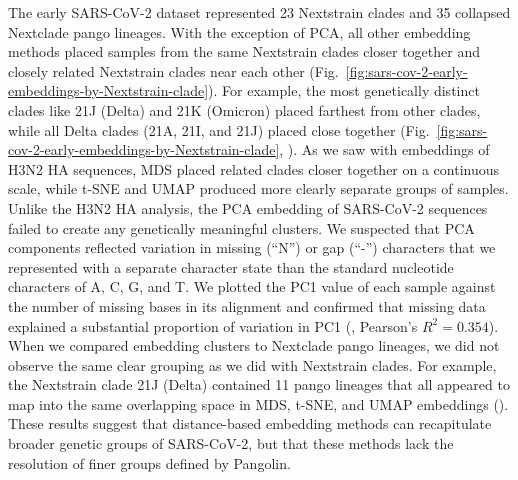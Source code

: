 \documentclass[10pt,letterpaper]{article}
\begin{document}
The early SARS-CoV-2 dataset represented 23 Nextstrain clades and 35 collapsed Nextclade pango lineages.
With the exception of PCA, all other embedding methods placed samples from the same Nextstrain clades closer together and closely related Nextstrain clades near each other (Fig.~\ref{fig:sars-cov-2-early-embeddings-by-Nextstrain-clade}).
For example, the most genetically distinct clades like 21J (Delta) and 21K (Omicron) placed farthest from other clades, while all Delta clades (21A, 21I, and 21J) placed close together (Fig.~\ref{fig:sars-cov-2-early-embeddings-by-Nextstrain-clade}, ).
As we saw with embeddings of H3N2 HA sequences, MDS placed related clades closer together on a continuous scale, while t-SNE and UMAP produced more clearly separate groups of samples.
Unlike the H3N2 HA analysis, the PCA embedding of SARS-CoV-2 sequences failed to create any genetically meaningful clusters.
We suspected that PCA components reflected variation in missing (``N'') or gap (``-'') characters that we represented with a separate character state than the standard nucleotide characters of A, C, G, and T.
We plotted the PC1 value of each sample against the number of missing bases in its alignment and confirmed that missing data explained a substantial proportion of variation in PC1 (, Pearson's $R^{2}=0.354$).
When we compared embedding clusters to Nextclade pango lineages, we did not observe the same clear grouping as we did with Nextstrain clades.
For example, the Nextstrain clade 21J (Delta) contained 11 pango lineages that all appeared to map into the same overlapping space in MDS, t-SNE, and UMAP embeddings ().
These results suggest that distance-based embedding methods can recapitulate broader genetic groups of SARS-CoV-2, but that these methods lack the resolution of finer groups defined by Pangolin.
\end{document}
